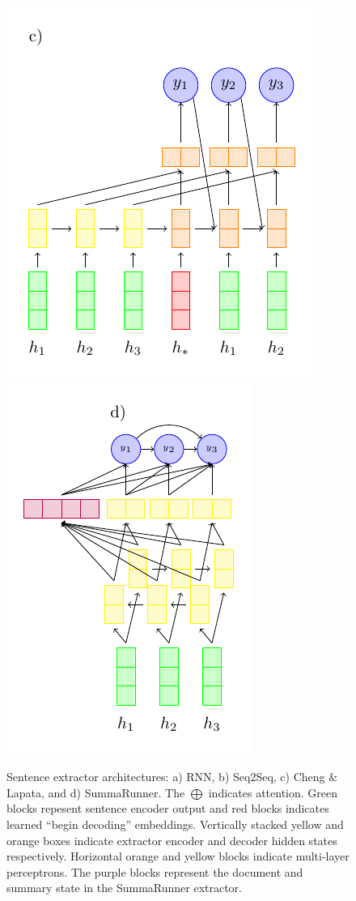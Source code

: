 \begin{figure}
  \includegraphics[scale=.65]{figures/clextractor.pdf}
  \includegraphics[scale=.65]{figures/sr_extractor.pdf}
  \caption{Sentence extractor architectures: a) RNN, b) Seq2Seq,
  c) Cheng \& Lapata, and d) SummaRunner. The $\bigoplus$ indicates 
  attention. Green blocks repesent sentence encoder output and red blocks indicates learned ``begin decoding'' embeddings. Vertically stacked yellow and orange boxes
  indicate
  extractor encoder and decoder hidden states respectively.
  Horizontal orange and yellow blocks indicate multi-layer perceptrons.
  The purple blocks represent the document and summary state in the SummaRunner extractor. }
  \label{fig:extractors}
\end{figure}




